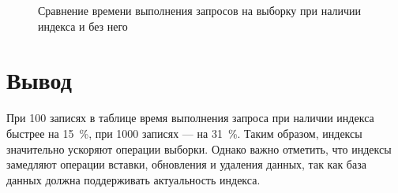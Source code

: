 \clearpage
\begin{figure}[h!]
	\centering
	\caption{Сравнение времени выполнения запросов на выборку при наличии индекса и без него}
	\label{img:g1}
\end{figure}

\section*{Вывод}
При 100 записях в таблице время выполнения запроса при наличии индекса быстрее на 15~\%, при 1000 записях --- на 31~\%.
Таким образом, индексы значительно ускоряют операции выборки.
Однако важно отметить, что индексы замедляют операции вставки, обновления и удаления данных, так как база данных должна поддерживать актуальность индекса. 
